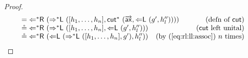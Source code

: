 \documentclass[a4paper,UKenglish,cleveref,autoref,thm-restate, anonymous]{lipics-v2021}
\renewcommand{\vec}[1]{\overrightarrow{#1}}
\newcommand{\Larr}{\Leftarrow}
\newcommand{\Ls}{\Leftarrow^*}
\newcommand{\Rs}{\Rightarrow^*}
\newcommand{\mf}[1]{\mathsf{#1}}
\newcommand{\vd}{\vdash}
\newcommand{\ax}{\mathsf{ax}}
\newcommand{\Ll}{{\Larr}\mathsf{L}}
\newcommand{\Lsl}{{\Ls}\mathsf{L}}
\newcommand{\Lsr}{{\Ls}\mathsf{R}}
\newcommand{\Rsl}{{\Rs}\mathsf{L}}
\newcommand{\cut}{\mf{cut}}
\newcommand{\cuts}{\mf{cut}^*}
\begin{document}
\begin{proof}
\[\begin{array}{lr}
    = \Lsr \ (\Rsl \ ([h_1,\dots,h_n], \cuts \ (\vec{\ax}, \Ll \ (g',h''_l))))
    & \hspace*{-1.5cm}\text{(defn of $\cut$)}
    \\
    \circeq \Lsr \ (\Rsl \ ([h_1,\dots,h_n], \Ll \ (g', h''_l)))
    &\hspace*{-1.5cm}\text{($\cut$ left unital)}
    \\
    \circeq \Lsr \ (\Ll \ (\Rsl \ ([h_1,\dots,h_n], g'),h''_l))
    &\hspace*{-1.5cm}\text{(by (\ref{eq:rl:ll:assoc}) $n$ times)}
  \end{array}
\]


\end{proof}
\end{document}
